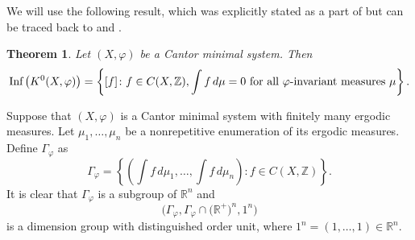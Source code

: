 \documentclass{amsart}
\newtheorem{theorem}{Theorem}[section]
\newtheorem{corollary}[theorem]{Corollary}
\theoremstyle{definition}
\theoremstyle{problem}
\theoremstyle{remark}
\numberwithin{equation}{section}
\begin{document}




We will use the following result, which was explicitly stated as a part of \cite[Theorem 1.13]{GPS} but can be traced back to \cite[Theorem 5.5]{HPS} and \cite[Corollary 4.2]{EffrosBook}.


\begin{theorem}\label{thm:GPS2} Let $(X,\varphi)$ be a Cantor minimal system. Then
$$\mbox{\rm Inf}\left(K^0(X, \varphi)\right)=\left\{[f]\colon  f\in C(X,\mathbb Z), \int f\,d \mu =0\mbox{ for all } \varphi \mbox{-invariant measures }\mu\right\}.$$
\end{theorem} 




Suppose that $(X,\varphi)$ is  a Cantor minimal system with finitely many ergodic measures. Let $\mu_1,\dots, \mu_n$ be a nonrepetitive enumeration of its ergodic measures. Define $\Gamma_\varphi$ as 
$$\Gamma_\varphi= \left\{\left(\int f\,d\mu_1,\dots , \int f\,d\mu_n\right)\colon  f \in C(X,\mathbb Z)\right\}.$$
It is clear that $\Gamma_\varphi$ is a subgroup of $\mathbb R^n$ and 
$$\bigl(\Gamma_\varphi, \Gamma_\varphi\cap\bigl( \mathbb R^+\bigr)^n, 1^n \bigr)$$ is a dimension group with distinguished order unit, where $1^n=(1,\dots, 1)\in \mathbb{R}^n$.
\end{document}
